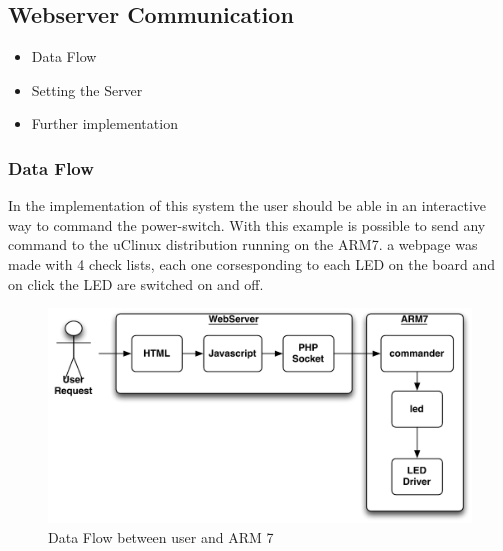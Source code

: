 \subsection{Webserver Communication}
\begin{itemize}
	\item Data Flow
	\item Setting the Server
	\item Further implementation
\end{itemize}

\subsubsection{Data Flow}
In the implementation of this system the user should be able in an interactive way to command the power-switch. With this example is possible to send any command to the uClinux distribution running on the ARM7.
a webpage was made with 4 check lists, each one corsesponding to each LED on the board and on click the LED are switched on and off.
\begin{figure}[H]
	\begin{centering}
		 \includegraphics[width=1.0\textwidth,page=1]{images/dataflowPHP.pdf}
		\caption{Data Flow between user and ARM 7}
	\end{centering}
\end{figure}

